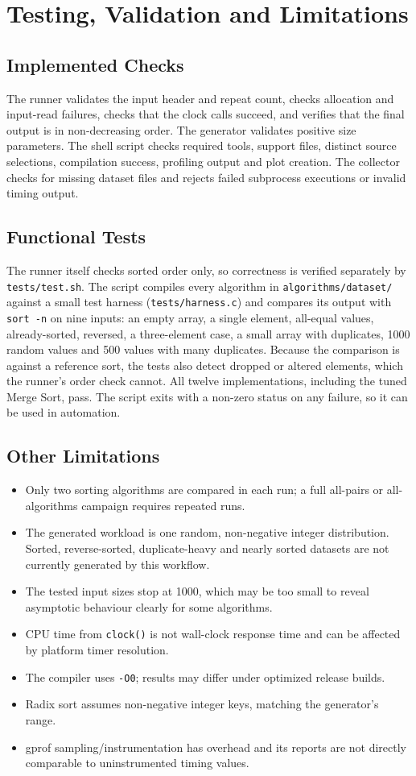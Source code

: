 \documentclass[12pt,a4paper,oneside]{report}
\begin{document}
\chapter{Testing, Validation and Limitations}
\section{Implemented Checks}
The runner validates the input header and repeat count, checks allocation and input-read failures, checks that the clock calls succeed, and verifies that the final output is in non-decreasing order. The generator validates positive size parameters. The shell script checks required tools, support files, distinct source selections, compilation success, profiling output and plot creation. The collector checks for missing dataset files and rejects failed subprocess executions or invalid timing output.
\section{Functional Tests}
The runner itself checks sorted order only, so correctness is verified separately by \texttt{tests/test.sh}. The script compiles every algorithm in \texttt{algorithms/dataset/} against a small test harness (\texttt{tests/harness.c}) and compares its output with \texttt{sort -n} on nine inputs: an empty array, a single element, all-equal values, already-sorted, reversed, a three-element case, a small array with duplicates, 1000 random values and 500 values with many duplicates. Because the comparison is against a reference sort, the tests also detect dropped or altered elements, which the runner's order check cannot. All twelve implementations, including the tuned Merge Sort, pass. The script exits with a non-zero status on any failure, so it can be used in automation.
\section{Other Limitations}
\begin{itemize}[leftmargin=*]
\item Only two sorting algorithms are compared in each run; a full all-pairs or all-algorithms campaign requires repeated runs.
\item The generated workload is one random, non-negative integer distribution. Sorted, reverse-sorted, duplicate-heavy and nearly sorted datasets are not currently generated by this workflow.
\item The tested input sizes stop at 1000, which may be too small to reveal asymptotic behaviour clearly for some algorithms.
\item CPU time from \texttt{clock()} is not wall-clock response time and can be affected by platform timer resolution.
\item The compiler uses \texttt{-O0}; results may differ under optimized release builds.
\item Radix sort assumes non-negative integer keys, matching the generator's range.
\item gprof sampling/instrumentation has overhead and its reports are not directly comparable to uninstrumented timing values.
\end{itemize}
\end{document}
